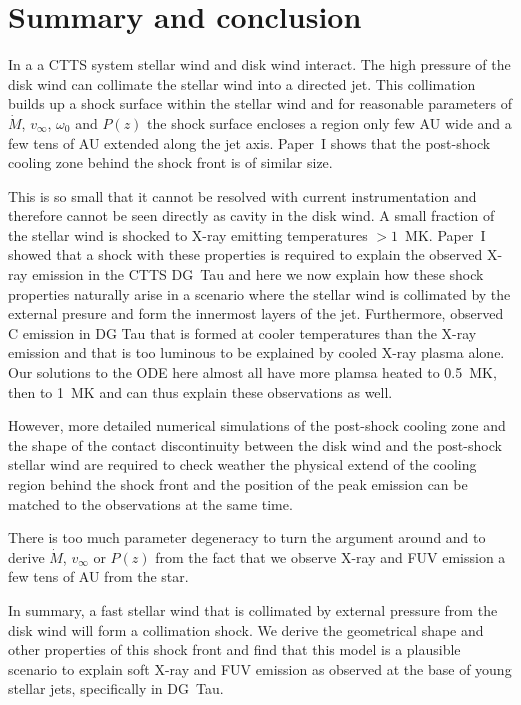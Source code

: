 \section{Summary and conclusion}
\label{sect:conclusion}
In a a CTTS system stellar wind and disk wind interact. The high pressure of the disk wind can collimate the stellar wind into a directed jet. This collimation builds up a shock surface within the stellar wind and for reasonable parameters of $\dot M$, $v_\infty$, $\omega_0$ and $P(z)$ the shock surface encloses a region only few AU wide and a few tens of AU extended along the jet axis. 
Paper~I shows that the post-shock cooling zone behind the shock front is of similar size.
 
This is so small that it cannot be resolved with current instrumentation and therefore cannot be seen directly as cavity in the disk wind. A small fraction of the stellar wind is shocked to X-ray emitting temperatures $>1$~MK. 
Paper~I showed that a shock with these properties is required to explain the observed X-ray emission in the CTTS DG~Tau and here we now explain how these shock properties naturally arise in a scenario where the stellar wind is collimated by the external presure and form the innermost layers of the jet.
Furthermore, \citet{2013A&A...550L...1S} observed C emission in DG Tau that is formed at cooler temperatures than the X-ray emission and that is too luminous to be explained by cooled X-ray plasma alone. Our solutions to the ODE here almost all have more plamsa heated to 0.5~MK, then to 1~MK and can thus explain these observations as well.

However, more detailed numerical simulations of the post-shock cooling zone and the shape of the contact discontinuity between the disk wind and the post-shock stellar wind are required to check weather the physical extend of the cooling region behind the shock front and the position of the peak emission can be matched to the observations at the same time.

There is too much parameter degeneracy to turn the argument around and to derive $\dot M$, $v_\infty$ or $P(z)$ from the fact that we observe X-ray and FUV emission a few tens of AU from the star.

In summary, a fast stellar wind that is collimated by external pressure from the disk wind will form a collimation shock. We derive the geometrical shape and other properties of this shock front and find that this model is a plausible scenario to explain soft X-ray and FUV emission as observed at the base of young stellar jets, specifically in DG~Tau.


